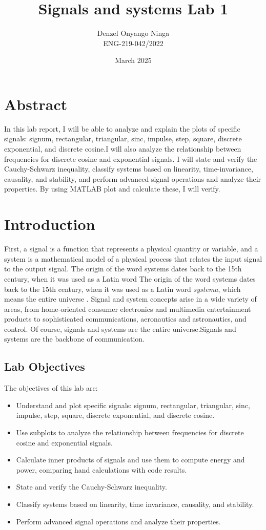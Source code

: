\documentclass[10pt, twocolumn]{article}
\title{Signals and systems Lab 1}
\author{Denzel Onyango Ninga \\ ENG-219-042/2022}
\date{March 2025}
\begin{document}
\maketitle

\section{Abstract}
In this lab report, I will be able to analyze and explain the plots of specific signals: signum, rectangular, triangular, sinc, impulse,
step, square, discrete exponential, and discrete cosine.I will also analyze the relationship between frequencies for discrete cosine and exponential signals. I will state and verify the Cauchy-Schwarz inequality, classify systems based on linearity, time-invariance, causality, and stability, and perform advanced signal operations and analyze their properties. By using MATLAB plot and calculate these, I will verify.
\section{Introduction}
First, a signal is a function that represents a physical quantity or variable, and a system is a mathematical model of a physical process that relates the input signal to the output signal. 
The origin of the word systems dates back to the 15th century, 
when it was used as a Latin word The origin of the word systems dates back to the 15th century,
when it was used as a Latin word \textit{systema},
which means the entire universe \cite[p.~19]{vural2022signals}. 
Signal and system concepts arise in a wide variety of areas, from home-oriented consumer electronics and multimedia entertainment products to sophisticated communications, aeronautics and astronautics, and control. Of course, signals and systems are the entire universe.Signals and systems are the backbone of communication.
\subsection{Lab Objectives}
The objectives of this lab are:
\begin{itemize}
    \item Understand and plot specific signals: signum, rectangular, triangular, sinc, impulse, step, square, discrete exponential, and discrete cosine.
    \item Use subplots to analyze the relationship between frequencies for discrete cosine and exponential signals.
    \item Calculate inner products of signals and use them to compute energy and power, comparing hand calculations with code results.
    \item State and verify the Cauchy-Schwarz inequality.
    \item Classify systems based on linearity, time invariance, causality, and stability.
    \item Perform advanced signal operations and analyze their properties.
\end{itemize}
\end{document}
